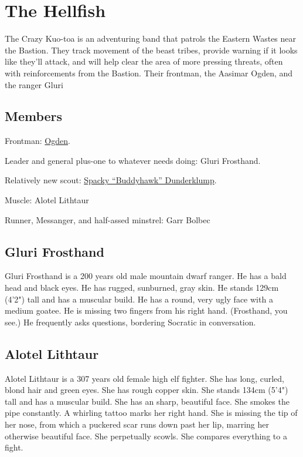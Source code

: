 \section{The Hellfish}

The Crazy Kuo-toa is an adventuring band that patrols the Eastern Wastes near the Bastion.
They track movement of the beast tribes, provide warning if it looks like they'll attack, and will
  help clear the area of more pressing threats, often with reinforcements from the Bastion.
Their frontman, the Aasimar Ogden, and the ranger Gluri
\subsection{Members}

Frontman:
\hyperref[subsec:ogden]{Ogden}.

Leader and general plus-one to whatever needs doing: Gluri Frosthand.

Relatively new scout:
\hyperref[subsec:buddyhawks]{Spacky ``Buddyhawk'' Dunderklump}.

Muscle:
Alotel Lithtaur

Runner, Messanger, and half-assed minstrel:
Garr Bolbec

\subsection{Gluri Frosthand}

Gluri Frosthand is a 200 years old male mountain dwarf ranger.
He has a bald head and black eyes.
He has rugged, sunburned, gray skin.
He stands 129cm (4'2") tall and has a muscular build.
He has a round, very ugly face with a medium goatee.
He is missing two fingers from his right hand.
(Frosthand, you see.)
He frequently asks questions, bordering Socratic in conversation.

\subsection{Alotel Lithtaur}
Alotel Lithtaur is a 307 years old female high elf fighter.
She has long, curled, blond hair and green eyes.
She has rough copper skin.
She stands 134cm (5'4") tall and has a muscular build.
She has an sharp, beautiful face.
She smokes the pipe constantly.
A whirling tattoo marks her right hand.
She is missing the tip of her nose, from which a puckered scar runs down past her lip,
  marring her otherwise beautiful face.
She perpetually scowls.
She compares everything to a fight.

